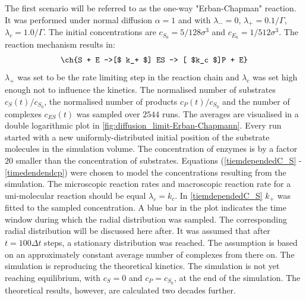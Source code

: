 \documentclass[
  a4paper,BCOR10mm,twoside,
  headsepline,footsepline,%
  fleqn,openbib
]{scrbook}
\begin{document}
\begin{figure}

  \label{fig:diffusion_limit-Erban-Chapmann_k1}
\end{figure}
The first scenario will be referred to as the one-way "Erban-Chapman" reaction. It was performed under normal diffusion $\alpha=1$ and with $\lambda_-=0 $, $\lambda_+=0.1 /\Gamma$, $\lambda_c=1.0 /\Gamma$. The initial concentrations are $c_{S_0}=5/128\sigma^3$ and $c_{E_0}=1/512 \sigma^3$. The reaction mechanism results in:
\begin{align} \label{eq:michaelismechanismneu}
\ch{S + E ->[$ k_+ $] ES -> [ $k_c $]P + E}
\end{align}
$\lambda_+$ was set to be the rate limiting step in the reaction chain and $\lambda_c$ was set high enough not to influence the kinetics.
The normalised number of substrates $c_{S}(t)/c_{S_0}$, the normalised number of products $c_{P}(t)/c_{S_0}$ and the number of complexes $c_{ES}(t)$ was sampled over $2544$ runs. The averages are visualised in a double logarithmic plot in \cref{fig:diffusion_limit-Erban-Chapmann}. Every run started with a new uniformly-distributed initial position of the substrate molecules in the simulation volume. The concentration of enzymes is by a factor $20$  smaller than the concentration of substrates. Equations (\ref{tiemdependedC_S} - \ref{timedendendcp})  were chosen to model the concentrations resulting from the simulation. The microscopic reaction rates and macroscopic reaction rate for a uni-molecular reaction should be equal $\lambda_c=k_c$. In \cref{tiemdependedC_S} $k_+$ was fitted to the sampled concentration. A blue bar in the plot indicates the time window during which the radial distribution was sampled. The corresponding radial distribution will be discussed here after. It was assumed that after $t=100 \Delta t$ steps, a stationary distribution was reached. The assumption is based on an approximately constant average number of complexes from there on. The simulation is reproducing the theoretical kinetics. The simulation is not yet reaching equilibrium, with $c_S=0$ and $c_P=c_{S_0}$, at the end of the simulation. The theoretical results, however, are calculated two decades further. \par
\end{document}
